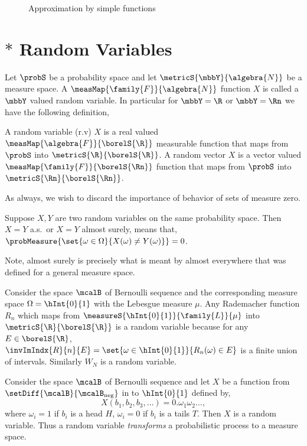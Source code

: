 \begin{figure}
  
  \caption{Approximation by simple functions}\label{fig:tikz:approx_simple_func}
\end{figure}
\break{}
\section{{$\ast$} Random Variables}
Let $\probS$ be a probability space and let $\metricS{\mbbY}{\algebra{N}}$ be a measure space. A
$\measMap{\family{F}}{\algebra{N}}$ function $X$ is called a $\mbbY$ valued random variable.
In particular for $\mbbY = \R$ or $\mbbY = \Rn$ we have the following definition,
\begin{Definition}[name=Random variable]
    A random variable (r.v) $X$ is a real valued 
    $\measMap{\algebra{F}}{\borelS{\R}}$ measurable function that maps from $\probS$ into
    $\metricS{\R}{\borelS{\R}}$. A random vector $X$ is a vector valued $\measMap{\family{F}}{\borelS{\Rn}}$
    function that maps from $\probS$ into $\metricS{\Rn}{\borelS{\Rn}}$.
\end{Definition}
As always, we wish to discard the importance of behavior of sets of measure zero.
\begin{Definition}[name=Almost surely]
    Suppose $X,Y$ are two random variables on the same probability space. Then $X = Y$ a.s.~or $X = Y$ almost
    surely, means that,
    $\probMeasure{\set{\omega\in\Omega}{X(\omega) \neq Y(\omega)} }= 0$.
\end{Definition}
Note, almost surely is precisely what is meant by almost everywhere that was defined for a general measure
space.
\begin{Example}
    Consider the space $\mcalB$ of Bernoulli sequence and the corresponding measure space $\Omega = \hInt{0}{1}$
    with the Lebesgue measure $\mu$. Any Rademacher function $R_n$ which maps from
    $\measureS{\hInt{0}{1}}{\family{L}}{\mu}$ into $\metricS{\R}{\borelS{\R}}$ 
    is a random variable because for any $E\in\borelS{\R}$, 
    $\invImIndx{R}{n}{E} = \set{\omega\in\hInt{0}{1}}{R_n(\omega)\in E}$ is a finite union of
    intervals. Similarly $W_N$ is a random variable.
\end{Example}
\begin{Example}
    Consider the space $\mcalB$ of Bernoulli sequence and let $X$ be a function from
    $\setDiff{\mcalB}{\mcalB_{\text{neg}}}$ in to $\hInt{0}{1}$ defined by,
    \[X(b_1,b_2,b_3,\dots) = 0.\omega_1\omega_2\dots,\]
    where $\omega_i = 1$ if $b_i$ is a head $H$, $\omega_i = 0$ if $b_i$ is a tails $T$. Then $X$ is a random
    variable. Thus a random variable \emph{transforms} a probabilistic process to a measure space.
\end{Example}
